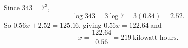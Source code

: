 Since $343=7^3$,
\[\log343=3\log7=3(0.84)=2.52 .\]
So $0.56x+2.52=125.16$, giving $0.56x=122.64$ and
\[x=\dfrac{122.64}{0.56}=\boxed{219}\ \text{kilowatt-hours}.\]

